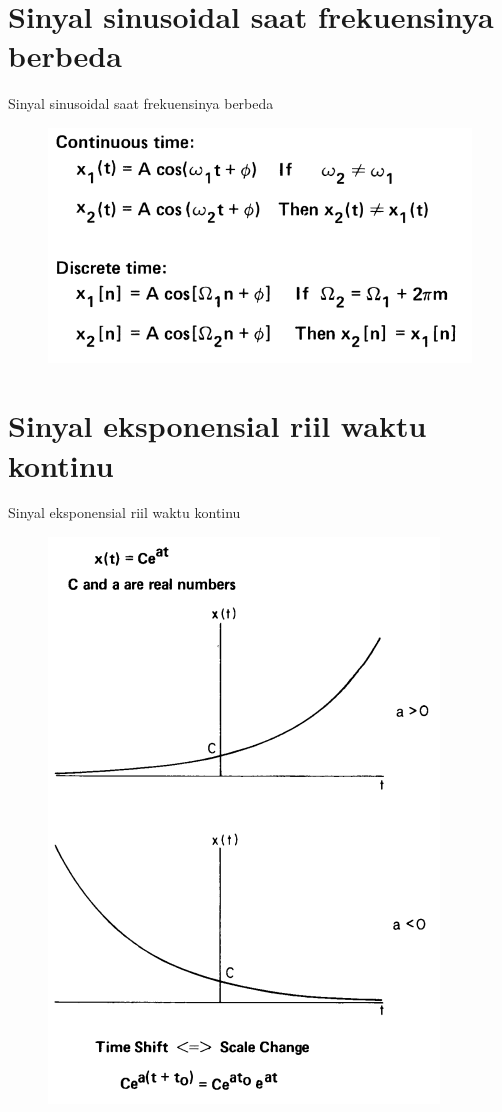\documentclass[pdflatex,compress,mathserif]{beamer}
\begin{document}
\section{Sinyal sinusoidal saat frekuensinya berbeda}
\begin{frame}{Sinyal sinusoidal saat frekuensinya berbeda}
	\begin{figure}
		\centering
		\includegraphics[height=0.7\textheight]{img/01.slide_13}
	\end{figure}
\end{frame}

\section{Sinyal eksponensial riil waktu kontinu}
\begin{frame}{Sinyal eksponensial riil waktu kontinu}
	\begin{figure}
		\centering
		\includegraphics[height=0.8\textheight]{img/01.slide_14}
	\end{figure}
\end{frame}
\end{document}

